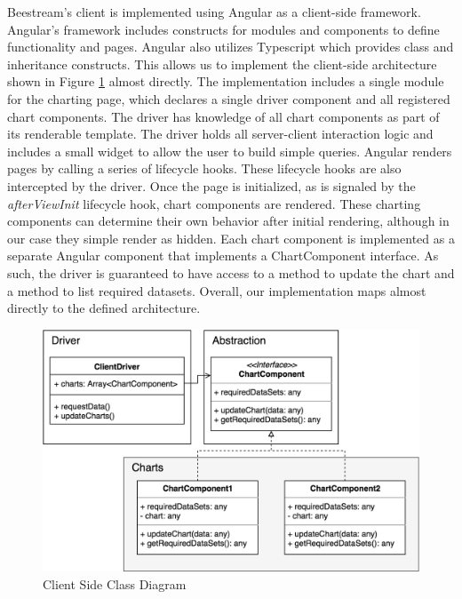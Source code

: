 Beestream’s client is implemented using Angular as a client-side framework.  Angular’s framework includes constructs for modules and components to define functionality and pages. Angular also utilizes Typescript which provides class and inheritance constructs.  This allows us to implement the client-side architecture shown in Figure \ref{fig:client-side-class} almost directly.  The implementation includes a single module for the charting page, which declares a single driver component and all registered chart components.  The driver has knowledge of all chart components as part of its renderable template.  The driver holds all server-client interaction logic and includes a small widget to allow the user to build simple queries.  Angular renders pages by calling a series of lifecycle hooks.  These lifecycle hooks are also intercepted by the driver.  Once the page is initialized, as is signaled by the \textit{afterViewInit} lifecycle hook, chart components are rendered.  These charting components can determine their own behavior after initial rendering, although in our case they simple render as hidden.  Each chart component is implemented as a separate Angular component that implements a ChartComponent interface.  As such, the driver is guaranteed to have access to a method to update the chart and a method to list required datasets.  Overall, our implementation maps almost directly to the defined architecture. \par

\begin{figure}
  \centering
  \includegraphics[width=6in]{images/ClientSide.png}
  \caption{Client Side Class Diagram}
  \label{fig:client-side-class}
\end{figure}

